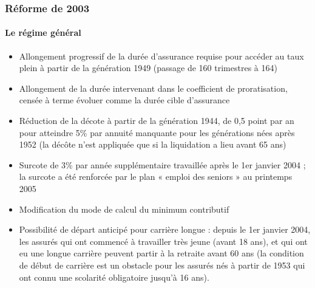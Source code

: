 \subsubsection{Réforme de 2003}

\paragraph{Le régime général}

\begin{itemize}
   \item	Allongement progressif de la durée d'assurance requise pour accéder au taux plein à partir de la génération 1949 (passage de 160 
         trimestres à 164)
   \item	Allongement de la durée intervenant dans le coefficient de proratisation, censée à terme évoluer comme la durée cible d'assurance
   \item	Réduction de la décote à partir de la génération 1944, de 0,5 point par an pour atteindre 5\% par annuité manquante pour les 
         générations nées après 1952 (la décôte n'est appliquée que si la liquidation a lieu avant 65 ans)
   \item	Surcote de 3\% par année supplémentaire travaillée après le 1er janvier 2004 ; la surcote a été renforcée par le plan « emploi des 
seniors » au printemps 2005
   \item	Modification du mode de calcul du minimum contributif
   \item	Possibilité de départ anticipé pour carrière longue : depuis le 1er janvier 2004, les assurés qui ont commencé à travailler très 
         jeune (avant 18 ans), et qui ont eu une longue carrière  peuvent partir à la retraite avant 60 ans (la condition de début de carrière est 
         un obstacle pour les assurés nés à partir de 1953 qui ont connu une scolarité obligatoire jusqu'à 16 ans).
\end{itemize}


